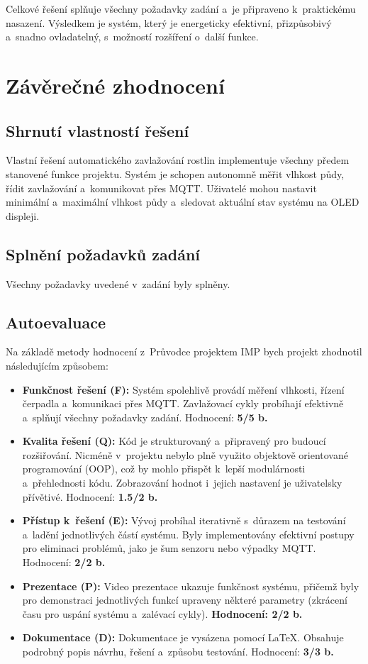 \documentclass[a4paper, 11pt]{article}
\begin{document}
Celkové řešení splňuje všechny požadavky zadání a~je připraveno k~praktickému nasazení. Výsledkem je systém, který je energeticky efektivní, 
přizpůsobivý a~snadno ovladatelný, s~možností rozšíření o~další funkce.

\section{Závěrečné zhodnocení}

\subsection{Shrnutí vlastností řešení}

Vlastní řešení automatického zavlažování rostlin implementuje všechny předem stanovené funkce projektu. 
Systém je schopen autonomně měřit vlhkost půdy, řídit zavlažování a~komunikovat přes MQTT. 
Uživatelé mohou nastavit minimální a~maximální vlhkost půdy a~sledovat aktuální stav systému na OLED displeji.

\subsection{Splnění požadavků zadání}

Všechny požadavky uvedené v~zadání byly splněny.

\subsection{Autoevaluace}

Na základě metody hodnocení z~Průvodce projektem IMP\cite{pruvodce_projektem_imp} bych projekt zhodnotil následujícím způsobem:
\begin{itemize}
    \item \textbf{Funkčnost řešení (F):} Systém spolehlivě provádí měření vlhkosti, řízení čerpadla a~komunikaci přes MQTT. Zavlažovací cykly probíhají efektivně a~splňují všechny požadavky zadání. Hodnocení: \textbf{5/5 b.}
    \item \textbf{Kvalita řešení (Q):} Kód je strukturovaný a~připravený pro budoucí rozšiřování. Nicméně v~projektu nebylo plně využito objektově orientované programování (OOP), což by mohlo přispět k~lepší modulárnosti a~přehlednosti kódu. Zobrazování hodnot i~jejich nastavení je uživatelsky přívětivé. Hodnocení: \textbf{1.5/2 b.}
    \item \textbf{Přístup k~řešení (E):} Vývoj probíhal iterativně s~důrazem na testování a~ladění jednotlivých částí systému. Byly implementovány efektivní postupy pro eliminaci problémů, jako je šum senzoru nebo výpadky MQTT. Hodnocení: \textbf{2/2 b.}
    \item \textbf{Prezentace (P):} Video prezentace ukazuje funkčnost systému, přičemž byly pro demonstraci jednotlivých funkcí upraveny některé parametry (zkrácení času pro uspání systému a~zalévací cykly). \textbf{Hodnocení: 2/2 b.}
    \item \textbf{Dokumentace (D):} Dokumentace je vysázena pomocí \LaTeX. Obsahuje podrobný popis návrhu, řešení a~způsobu testování. Hodnocení: \textbf{3/3 b.}
\end{itemize}
\end{document}

